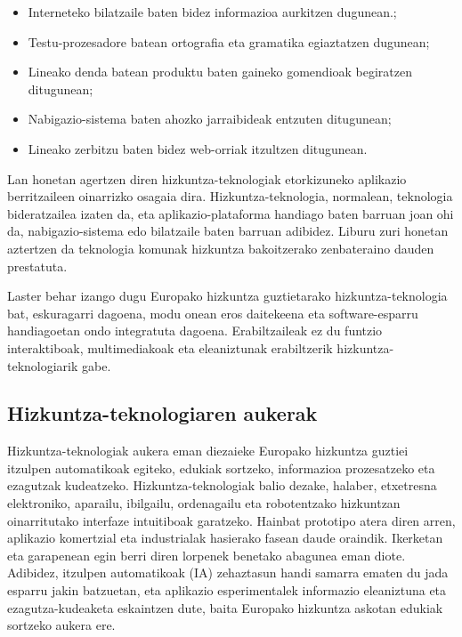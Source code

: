 \begin{multicols}{2}
    \begin{itemize}
      \item Interneteko bilatzaile baten bidez informazioa aurkitzen dugunean.;
      \item Testu-prozesadore batean ortografia eta gramatika egiaztatzen dugunean;
      \item Lineako denda batean produktu baten gaineko gomendioak begiratzen ditugunean;
      \item Nabigazio-sistema baten ahozko jarraibideak entzuten ditugunean;
      \item Lineako zerbitzu baten bidez web-orriak itzultzen ditugunean.
    \end{itemize}
    Lan honetan agertzen diren hizkuntza-teknologiak etorkizuneko aplikazio berritzaileen oinarrizko osagaia dira. Hizkuntza-teknologia, normalean, teknologia bideratzailea izaten da, eta aplikazio-plataforma handiago baten barruan joan ohi da, nabigazio-sistema edo bilatzaile baten barruan adibidez. Liburu zuri honetan aztertzen da teknologia komunak hizkuntza bakoitzerako zenbateraino dauden prestatuta. 


Laster behar izango dugu Europako hizkuntza guztietarako hizkuntza-teknologia bat, eskuragarri dagoena, modu onean eros daitekeena eta software-esparru handiagoetan ondo integratuta dagoena. Erabiltzaileak ez du funtzio interaktiboak, multimediakoak eta eleaniztunak erabiltzerik hizkuntza-teknologiarik gabe.

\subsection{Hizkuntza-teknologiaren aukerak}

    Hizkuntza-teknologiak aukera eman diezaieke Europako hizkuntza guztiei itzulpen automatikoak egiteko, edukiak sortzeko, informazioa prozesatzeko eta ezagutzak kudeatzeko. Hizkuntza-teknologiak balio dezake, halaber, etxetresna elektroniko, aparailu, ibilgailu, ordenagailu eta robotentzako hizkuntzan oinarritutako interfaze intuitiboak garatzeko. Hainbat prototipo atera diren arren, aplikazio komertzial eta industrialak hasierako fasean daude oraindik. Ikerketan eta garapenean egin berri diren lorpenek benetako abagunea eman diote. Adibidez, itzulpen automatikoak (IA) zehaztasun handi samarra ematen du jada esparru jakin batzuetan, eta aplikazio esperimentalek informazio eleaniztuna eta ezagutza-kudeaketa eskaintzen dute, baita Europako hizkuntza askotan edukiak sortzeko aukera ere. 


\end{multicols}
